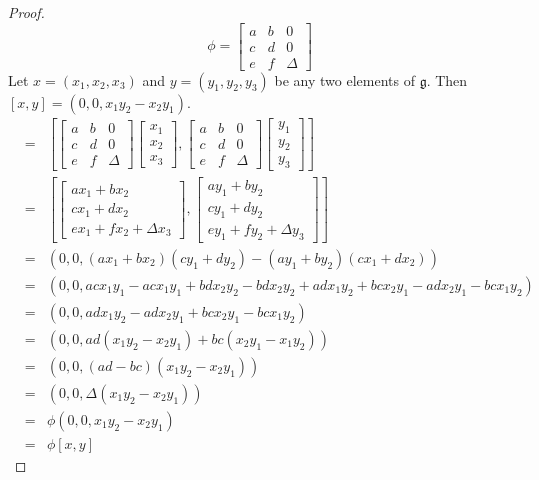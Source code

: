 \documentclass[honours]{UNSWthesis}
\newcommand{\g}{\mathfrak{g}}
\newcommand{\1}{\mathbf{e}_{1}}
\newcommand{\2}{\mathbf{e}_{3}}
\newcommand{\3}{\mathbf{e}_{3}}
\begin{document}
\begin{proof}
\[
\phi = 
\begin{bmatrix}
a & b & 0 \\
c & d & 0 \\
e & f & \Delta
\end{bmatrix}
\]
Let $x=(x_{1},x_{2},x_{3})$ and $y=(y_{1},y_{2},y_{3})$ be any two elements of $\g$. Then $[x,y]=(0,0,x_{1}y_{2}-x_{2}y_{1})$. 
\begin{eqnarray*}
[\phi(x),\phi(y)] &=& \left[
\begin{bmatrix}
a & b & 0 \\
c & d & 0 \\
e & f & \Delta
\end{bmatrix} 
\begin{bmatrix}
x_{1} \\ x_{2} \\ x_{3}
\end{bmatrix}
,
\begin{bmatrix}
a & b & 0 \\
c & d & 0 \\
e & f & \Delta
\end{bmatrix} 
\begin{bmatrix}
y_{1} \\ y_{2} \\ y_{3}
\end{bmatrix}
\right] \\
&=& \left[
\begin{bmatrix}
ax_{1}+bx_{2} \\ cx_{1}+dx_{2} \\ ex_{1}+fx_{2} + \Delta x_{3}
\end{bmatrix}
,
\begin{bmatrix}
ay_{1}+by_{2} \\ cy_{1}+dy_{2} \\ ey_{1}+fy_{2} + \Delta y_{3}
\end{bmatrix}
\right] \\
&=& (0,0,(ax_{1}+bx_{2})(cy_{1}+dy_{2})-(ay_{1}+by_{2})(cx_{1}+dx_{2})) \\
&=& (0,0,acx_{1}y_{1} - acx_{1}y_{1} + bdx_{2}y_{2} - bdx_{2}y_{2} + adx_{1}y_{2} + bcx_{2}y_{1} -adx_{2}y_{1} -bcx_{1}y_{2} ) \\
&=& (0,0, adx_{1}y_{2}  -adx_{2}y_{1}+ bcx_{2}y_{1} -bcx_{1}y_{2} ) \\
&=& (0,0,ad(x_{1}y_{2}  -x_{2}y_{1})+ bc(x_{2}y_{1} -x_{1}y_{2})) \\
&=& (0,0,(ad-bc)(x_{1}y_{2}  -x_{2}y_{1})) \\
&=& (0,0,\Delta(x_{1}y_{2}-x_{2}y_{1})) \\
&=& \phi(0,0,x_{1}y_{2}-x_{2}y_{1}) \\
&=& \phi[x,y] 
\end{eqnarray*}
\end{proof}
\end{document}
